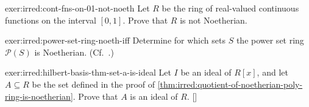 \begin{exer}{}{exer:irred:cont-fns-on-01-not-noeth}
  Let $R$ be the ring of real-valued continuous functions on the
  interval $[0, 1]$. Prove that $R$ is not Noetherian.
\end{exer}

\begin{exer}{}{exer:irred:power-set-ring-noeth-iff}
  Determine for which sets $S$ the power set ring $\mathscr{P}(S)$ is
  Noetherian. (Cf.\ .)
\end{exer}
\begin{exer}{\exerused}{exer:irred:hilbert-basis-thm-set-a-is-ideal}
  Let $I$ be an ideal of $R[x]$, and let $A \subseteq R$ be the set
  defined in the proof of \cref{thm:irred:quotient-of-noetherian-poly-ring-is-noetherian}. Prove that $A$ is an
  ideal of $R$.  []
\end{exer}

